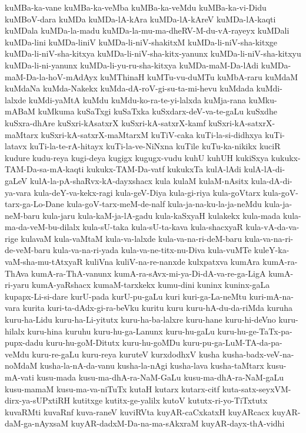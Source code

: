 {kuMBa-ka-vane
kuMBa-ka-veMba
kuMBa-ka-veMdu
kuMBa-ka-vi-Didu
kuMBoV-dara
kuMDa
kuMDa-lA-kAra
kuMDa-lA-kAreV
kuMDa-lA-kaqti
kuMDala
kuMDa-la-madu
kuMDa-la-mu-ma-dheRV-M-du-vA-rayeyx
kuMDali
kuMDa-lini
kuMDa-liniV
kuMDa-li-niV-shakitxM
kuMDa-li-niV-sha-kitxge
kuMDa-li-niV-sha-kitxya
kuMDa-li-niV-sha-kitx-yanunx
kuMDa-li-niV-sha-kitxyu
kuMDa-li-ni-yanunx
kuMDa-li-yu-ru-sha-kitxya
kuMDa-maM-Da-lAdi
kuMDa-maM-Da-la-hoV-mAdAyx
kuMThinaH
kuMTu-vu-duMTu
kuMbA-raru
kuMdaM
kuMdaNa
kuMda-Nakekx
kuMda-dA-roV-gi-su-ta-mi-hevu
kuMdada
kuMdi-lalxde
kuMdi-yaMtA
kuMdu
kuMdu-ko-ra-te-yi-lalxda
kuMja-rana
kuMku-mABaM
kuMkuma
kuSaTxgi
kuSaTxka
kuSxdarx-deV-va-te-gaLu
kuSxdhe
kuSxra-dhAre
kuSxri-kAsatxrX
kuSxri-kA-satxrX-kamf
kuSxri-kA-satxrX-maMtarx
kuSxri-kA-satxrX-maMtarxM
kuTiV-caka
kuTi-la-si-didhxya
kuTi-latavx
kuTi-la-te-rA-hitayx
kuTi-la-ve-NiNxna
kuTile
kuTu-ka-nikikx
kuciR
kudure
kudu-reya
kugi-deya
kugigx
kugugx-vudu
kuhU
kuhUH
kukiSxya
kukukx-TAM-Da-sa-mA-kaqti
kukukx-TAM-Da-vatf
kukukxTa
kulA-lAdi
kulA-lA-di-gaLeV
kulA-la-pA-shaRvx-kA-dayxshacx
kula
kulaM
kulaM-nAsitx
kula-dA-di-ya-vara
kula-deY-va-kekx-ragi
kula-geV-Diya
kula-gi-riya
kula-goVtarx
kula-goV-tarx-ga-Lo-Dane
kula-goV-tarx-meM-de-nalf
kula-ja-na-ku-la-ja-neMdu
kula-ja-neM-baru
kula-jaru
kula-kaM-ja-lA-gadu
kula-kaSxyaH
kulakekx
kula-mada
kula-ma-da-veM-bu-dilalx
kula-sU-taka
kula-sU-ta-kava
kula-shacxyaR
kula-vA-da-va-rige
kulavaM
kula-vaMtaM
kula-va-lalxde
kula-va-na-ri-deM-baru
kula-va-na-ri-de-veM-baru
kula-va-na-ri-yada
kula-va-ne-titx-nu-Diva
kula-vuMTe
kuleY-ka-vaM-sha-mu-tAtxyaR
kuliVna
kuliV-na-re-nanxde
kulxpatxva
kumAra
kumA-ra-ThAva
kumA-ra-ThA-vanunx
kumA-ra-sAvx-mi-ya-Di-dA-va-re-ga-LigA
kumA-ri-yaru
kumA-yaRshacx
kumaM-tarxkekx
kumu-dini
kuninx
kuninx-gaLa
kupapx-Li-si-dare
kurU-pada
kurU-pu-gaLu
kuri
kuri-ga-La-neMtu
kuri-mA-na-vara
kurita
kuri-ta-dAdx-gi-ra-beVku
kuritu
kuru
kuru-hA-du-da-riMda
kuruha
kuru-ha-Lidu
kuru-ha-Li-yitutx
kuru-ha-ba-lalxre
kuru-hane
kuru-hi-deVno
kuru-hilalx
kuru-hina
kuruhu
kuru-hu-ga-Lanunx
kuru-hu-gaLu
kuru-hu-ge-TaTx-pa-pupx-dadu
kuru-hu-goM-Ditutx
kuru-hu-goMDu
kuru-pu-ga-LuM-TA-da-pa-veMdu
kuru-re-gaLu
kuru-reya
kuruteV
kurxdodhxV
kusha
kusha-badx-veV-na-noMdaM
kusha-la-nA-da-vanu
kusha-la-nAgi
kusha-lava
kusha-taMtarx
kusu-mA-vati
kusu-mada
kusu-ma-dhA-ra-NaM-GaLu
kusu-ma-dhA-ra-NaM-gaLu
kusu-mamaM
kusu-ma-va-niTuTx
kutaH
kutarx
kutarx-citf
kuta-satx-seyxVM-dirx-ya-sUPxtiRH
kutitxge
kutitx-ge-yalilx
kutoV
kututx-ri-yo-TiTxtutx
kuvaRMti
kuvaRnf
kuva-raneV
kuviRVta
kuyAR-caCxkatxH
kuyARcacx
kuyAR-daM-ga-nAyxsaM
kuyAR-dadxM-Da-na-ma-sAkxraM
kuyAR-dayx-thA-vidhi
}
